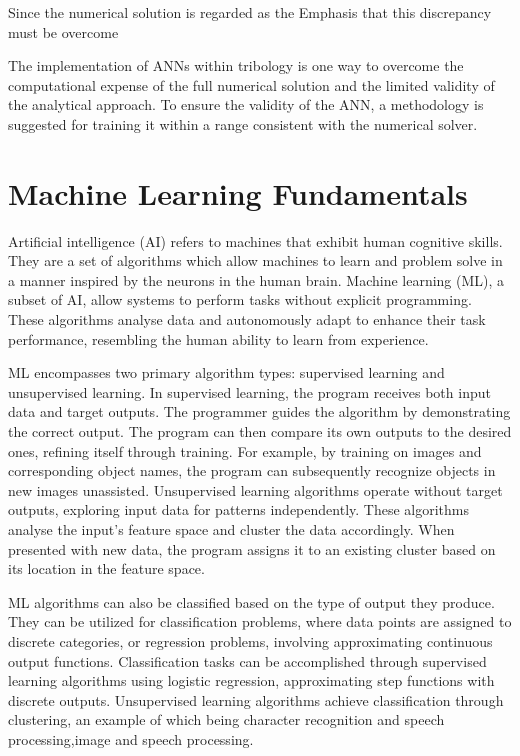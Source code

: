 Since the numerical solution is regarded as the 
Emphasis that this discrepancy must be overcome

The implementation of ANNs within tribology is one way to overcome the computational expense of the full numerical solution and the limited validity of the analytical approach.   To ensure the validity of the ANN, a methodology is suggested for training it within a range consistent with the numerical solver.

\section{Machine Learning Fundamentals}

Artificial intelligence (AI) refers to machines that exhibit human cognitive skills. They are a set of algorithms which allow machines to learn and problem solve in a manner inspired by the neurons in the human brain. Machine learning (ML), a subset of AI, allow systems to perform tasks without explicit programming. These algorithms analyse data and autonomously adapt to enhance their task performance, resembling the human ability to learn from experience. 

ML encompasses two primary algorithm types: supervised learning and unsupervised learning. In supervised learning, the program receives both input data and target outputs. The programmer guides the algorithm by demonstrating the correct output. The program can then compare its own outputs to the desired ones, refining itself through training. For example, by training on images and corresponding object names, the program can subsequently recognize objects in new images unassisted. Unsupervised learning algorithms operate without target outputs, exploring input data for patterns independently. These algorithms analyse the input's feature space and cluster the data accordingly. When presented with new data, the program assigns it to an existing cluster based on its location in the feature space.

ML algorithms can also be classified based on the type of output they produce. They can be utilized for classification problems, where data points are assigned to discrete categories, or regression problems, involving approximating continuous output functions. Classification tasks can be accomplished through supervised learning algorithms using logistic regression, approximating step functions with discrete outputs. Unsupervised learning algorithms achieve classification through clustering, an example of which being character recognition and speech processing,image and speech processing.

